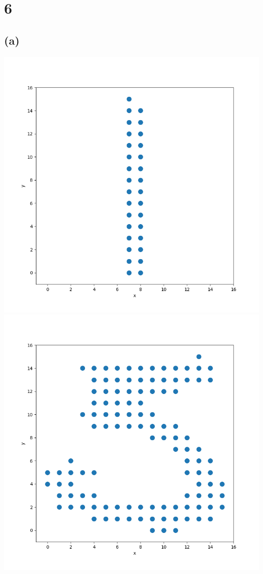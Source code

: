 \documentclass{article}
\begin{document}
	\section*{6}
	\subsection*{(a)}
		\includegraphics[scale=0.4]{1.png}
		\includegraphics[scale=0.4]{5.png}
	
\end{document}

